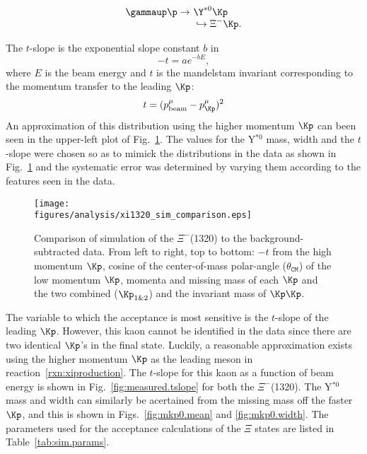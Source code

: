 \begin{singlespacing}\begin{align}
    \gammaup \p \rightarrow & \ \Y^{*0} \Kp \nonumber \\[-0.4em]
    & \ \hookrightarrow \Xi^{-} \Kp.
    \label{rxn:xiproduction}
\end{align}\end{singlespacing}
The $t$-slope is the exponential slope constant $b$ in
\begin{equation}
    -t = a e^{-b E},
\end{equation}
where $E$ is the beam energy and $t$ is the mandelstam invariant corresponding to the momentum transfer to the leading $\Kp$:
\begin{equation}
    t = ( p^\mu_\mathrm{beam} - p^{\mu}_{\Kp} )^2
\end{equation}
An approximation of this distribution using the higher momentum $\Kp$ can been seen in the upper-left plot of Fig.~\ref{fig:simcomp.xi1320}. The values for the Y$^{*0}$ mass, width and the $t$-slope were chosen so as to mimick the distributions in the data as shown in Fig.~\ref{fig:simcomp.xi1320} and the systematic error was determined by varying them according to the features seen in the data.

\begin{figure}[bh]\centering
    \texttt{[image: \\figures/analysis/xi1320\_sim\_comparison.eps]}
    \caption[Simulation / Data Comparion \texorpdfstring{$\Xi^-$}{Xi-}(1320)]{\label{fig:simcomp.xi1320}Comparison of simulation of the $\Xi^-$(1320) to the background-subtracted data. From left to right, top to bottom: $-t$ from the high momentum $\Kp$, cosine of the center-of-mass polar-angle ($\theta_\mathtt{CM}$) of the low momentum $\Kp$, momenta and missing mass of each $\Kp$ and the two combined ($\Kp_\mathrm{1\&2}$) and the invariant mass of $\Kp\Kp$.}
\end{figure}

The variable to which the acceptance is most sensitive is the $t$-slope of the leading $\Kp$. However, this kaon cannot be identified in the data since there are two identical $\Kp$'s in the final state. Luckily, a reasonable approximation exists using the higher momentum $\Kp$ as the leading meson in reaction~\ref{rxn:xiproduction}. The $t$-slope for this kaon as a function of beam energy is shown in Fig.~\ref{fig:measured.tslope} for both the $\Xi^-$(1320). The Y$^{*0}$ mass and width can similarly be acertained from the missing mass off the faster $\Kp$, and this is shown in Figs.~\ref{fig:mkp0.mean} and \ref{fig:mkp0.width}. The parameters used for the acceptance calculations of the $\Xi$ states are listed in Table~\ref{tab:sim.params}.

